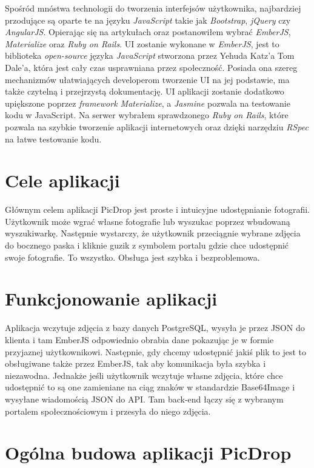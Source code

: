 \documentclass[brudnopis]{xmgr}
\begin{document}
Spośród mnóstwa technologii do tworzenia interfejsów użytkownika, najbardziej przodujące są oparte te na języku \textit{JavaScript} takie jak \textit{Bootstrap},\textit{ jQuery} czy\\ \textit{AngularJS}. Opierając się na artykułach \cite{} oraz \cite{} postanowiłem wybrać \textit{EmberJS}, \textit{Materialize} oraz \textit{Ruby on Rails}. UI zostanie wykonane w \textit{EmberJS}, jest to  biblioteka  \textit{open-source} języka \textit{JavaScript} stworzona  przez  Yehuda Katz'a  Tom Dale'a, która jest cały czas usprawniana przez społeczność. Posiada ona szereg mechanizmów ułatwiających developerom tworzenie UI na jej podstawie, ma także czytelną i przejrzystą dokumentację. UI aplikacji zostanie dodatkowo upiększone poprzez \textit{framework Materialize}, a \textit{Jasmine} pozwala na testowanie kodu w JavaScript. Na serwer  wybrałem sprawdzonego \textit{Ruby on Rails}, które pozwala na szybkie tworzenie aplikacji internetowych oraz dzięki narzędziu \textit{RSpec} na łatwe testowanie kodu. 

\section{Cele aplikacji}

Głównym celem aplikacji PicDrop jest proste i intuicyjne udostępnianie fotografii. Użytkownik może wgrać własne fotografie lub wyszukac poprzez wbudowaną wyszukiwarkę. Następnie wystarczy, że użytkownik przeciągnie wybrane zdjęcia do bocznego paska i kliknie guzik z symbolem portalu gdzie chce udostępnić swoje fotografie. To wszystko. Obsługa jest szybka i bezproblemowa. 

\section{Funkcjonowanie aplikacji}

Aplikacja wczytuje zdjęcia z bazy danych PostgreSQL, wysyła je przez JSON do klienta i tam EmberJS odpowiednio obrabia dane pokazując je w formie przyjaznej użytkownikowi. Następnie, gdy chcemy udostępnić jakiś plik to jest to obsługiwane także przez EmberJS, tak aby komunikacja była szybka i niezawodna. Jednakże jeśli użytkownik wczytuje własne zdjęcia, które chce udostępnić to są one zamieniane na ciąg znaków w standardzie Base64Image i wysyłane wiadomością JSON do API. Tam back-end łączy się z wybranym portalem społecznościowym i przesyła do niego zdjęcia. 

\section{Ogólna budowa aplikacji PicDrop}
\end{document}
